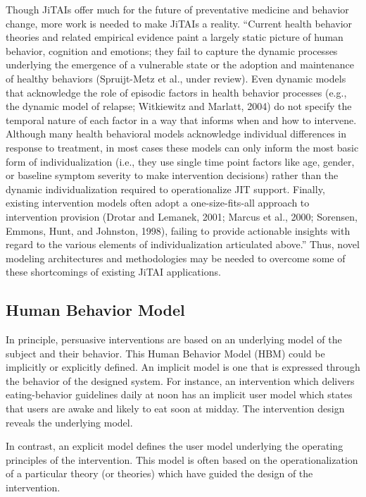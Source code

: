 \documentclass[runningheads,a4paper]{llncs}
\begin{document}
Though JiTAIs offer much for the future of preventative medicine and behavior change, more work is needed to make JiTAIs a reality.
“Current health behavior theories and related empirical evidence paint a largely static picture of human behavior, cognition and emotions; they fail to capture the dynamic processes underlying the emergence of a vulnerable state or the adoption and maintenance of healthy behaviors (Spruijt-Metz et al., under review). Even dynamic models that acknowledge the role of episodic factors in health behavior processes (e.g., the dynamic model of relapse; Witkiewitz and Marlatt, 2004) do not specify the temporal nature of each factor in a way that informs when and how to intervene. Although many health behavioral models acknowledge individual differences in response to treatment, in most cases these models can only inform the most basic form of individualization (i.e., they use single time point factors like age, gender, or baseline symptom severity to make intervention decisions) rather than the dynamic individualization required to operationalize JIT support. Finally, existing intervention models often adopt a one-size-fits-all approach to intervention provision (Drotar and Lemanek, 2001; Marcus et al., 2000; Sorensen, Emmons, Hunt, and Johnston, 1998), failing to provide actionable insights with regard to the various elements of individualization articulated above.” \cite{nahum2014}
Thus, novel modeling architectures and methodologies may be needed to overcome some of these shortcomings of existing JiTAI applications.
\subsection{Human Behavior Model}
In principle, persuasive interventions are based on an underlying  model of the subject and their behavior. 
This Human Behavior Model (HBM) could be implicitly or explicitly defined.
An implicit model is one that is expressed through the behavior of the designed system. 
For instance, an intervention which delivers eating-behavior guidelines daily at noon has an implicit user model which states that users are awake and likely to eat soon at midday.
The intervention design reveals the underlying model.

In contrast, an explicit model  defines the user model underlying the operating principles of the intervention. This model is often based on the operationalization of a particular theory (or theories) which have guided the design of the intervention.
\end{document}
